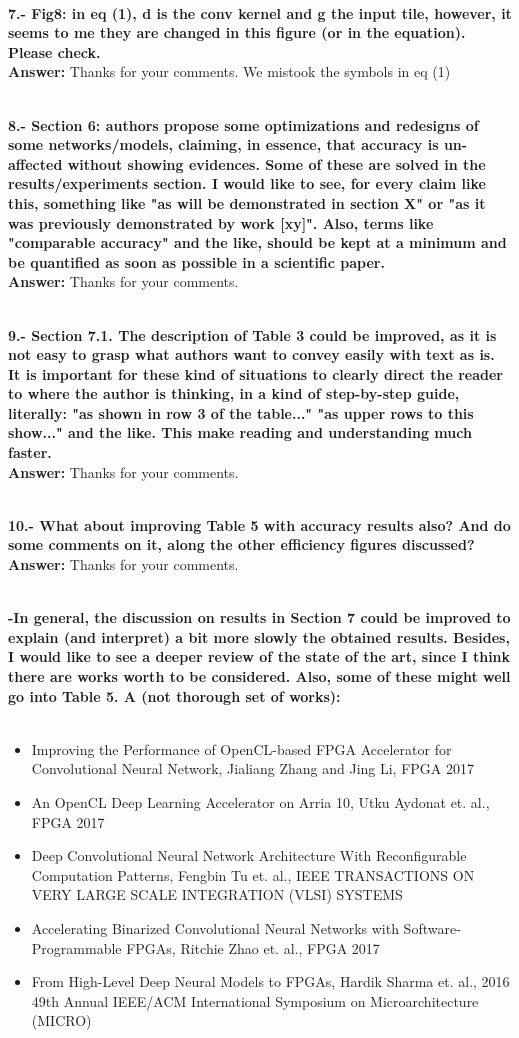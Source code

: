 \documentclass[12pt]{paper}
\newcommand{\rev}[1]{{{\color[rgb]{0,0,1}{#1}}}}
\newcommand{\answer}[1]{\noindent\textbf{Answer:} #1}
\newcommand{\comment}[1]{\noindent\textbf{\\ #1}\\}
\begin{document}
\comment{7.- Fig8: in eq (1), d is the conv kernel and g the input tile, however, it seems to me they are changed in this figure (or in the equation). Please check.  }
\answer{Thanks for your comments. We mistook the symbols in eq (1)}
\rev{We have corrected this error.}

\comment{8.- Section 6: authors propose some optimizations and redesigns of some networks/models, claiming, in essence, that accuracy is un-affected without showing evidences. Some of these are solved in the results/experiments section. I would like to see, for every claim like this, something like "as will be demonstrated in section X" or "as it was previously demonstrated by work [xy]". Also, terms like "comparable accuracy" and the like, should be kept at a minimum and be quantified as soon as possible in a scientific paper. }
\answer{Thanks for your comments.}
\rev{We have corrected this error.}


\comment{9.- Section 7.1. The description of Table 3 could be improved, as it is not easy to grasp what authors want to convey easily with text as is. It is important for these kind of situations to clearly direct the reader to where the author is thinking, in a kind of step-by-step guide, literally: "as shown in row 3 of the table..." "as upper rows to this show..." and the like. This make reading and understanding much faster. }
\answer{Thanks for your comments.}
\rev{We have corrected this error.}

\comment{10.- What about improving Table 5 with accuracy results also? And do some comments on it, along the other efficiency figures discussed? }
\answer{Thanks for your comments.}
\rev{We have corrected this error.}

\comment{-In general, the discussion on results in Section 7 could be improved to explain (and interpret) a bit more slowly the obtained results. Besides, I would like to see a deeper review of the state of the art, since I think there are works worth to be considered. Also, some of these might well go into Table 5. A (not thorough set of works):
} \\
\begin{itemize}
\item Improving the Performance of OpenCL-based FPGA Accelerator for Convolutional Neural Network, Jialiang Zhang and Jing Li, FPGA 2017
\item An OpenCL Deep Learning Accelerator on Arria 10, Utku Aydonat et. al., FPGA 2017
\item Deep Convolutional Neural Network Architecture With Reconfigurable Computation Patterns, Fengbin Tu et. al., IEEE TRANSACTIONS ON VERY LARGE SCALE INTEGRATION (VLSI) SYSTEMS
\item Accelerating Binarized Convolutional Neural Networks with Software-Programmable FPGAs, Ritchie Zhao et. al., FPGA 2017
\item From High-Level Deep Neural Models to FPGAs, Hardik Sharma et. al., 2016 49th Annual IEEE/ACM International Symposium on Microarchitecture (MICRO) 
\end{itemize}
\end{document}
